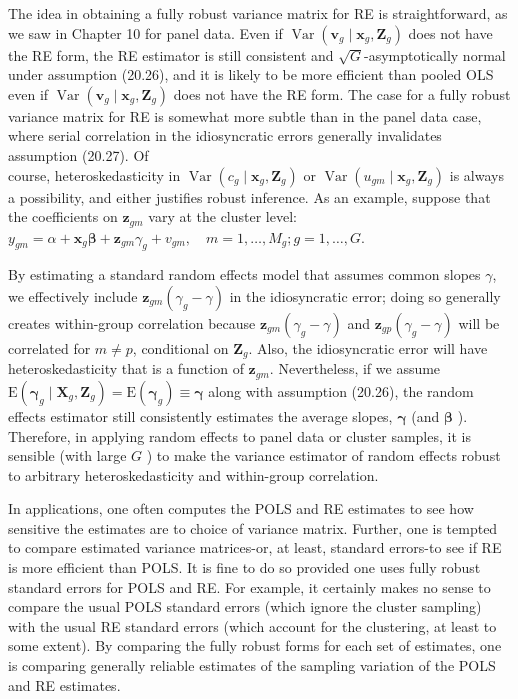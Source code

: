 \documentclass[10pt]{article}
\begin{document}
The idea in obtaining a fully robust variance matrix for RE is straightforward, as we saw in Chapter 10 for panel data. Even if $\operatorname{Var}\left(\mathbf{v}_{g} \mid \mathbf{x}_{g}, \mathbf{Z}_{g}\right)$ does not have the RE form, the RE estimator is still consistent and $\sqrt{G}$-asymptotically normal under assumption (20.26), and it is likely to be more efficient than pooled OLS even if $\operatorname{Var}\left(\mathbf{v}_{g} \mid \mathbf{x}_{g}, \mathbf{Z}_{g}\right)$ does not have the RE form. The case for a fully robust variance matrix for RE is somewhat more subtle than in the panel data case, where serial correlation in the idiosyncratic errors generally invalidates assumption (20.27). Of\\
course, heteroskedasticity in $\operatorname{Var}\left(c_{g} \mid \mathbf{x}_{g}, \mathbf{Z}_{g}\right)$ or $\operatorname{Var}\left(u_{g m} \mid \mathbf{x}_{g}, \mathbf{Z}_{g}\right)$ is always a possibility, and either justifies robust inference. As an example, suppose that the coefficients on $\mathbf{z}_{g m}$ vary at the cluster level:\\
$y_{g m}=\alpha+\mathbf{x}_{g} \boldsymbol{\beta}+\mathbf{z}_{g m} \gamma_{g}+v_{g m}, \quad m=1, \ldots, M_{g} ; g=1, \ldots, G$.

By estimating a standard random effects model that assumes common slopes $\gamma$, we effectively include $\mathbf{z}_{g m}\left(\gamma_{g}-\gamma\right)$ in the idiosyncratic error; doing so generally creates within-group correlation because $\mathbf{z}_{g m}\left(\gamma_{g}-\gamma\right)$ and $\mathbf{z}_{g p}\left(\gamma_{g}-\gamma\right)$ will be correlated for $m \neq p$, conditional on $\mathbf{Z}_{g}$. Also, the idiosyncratic error will have heteroskedasticity that is a function of $\mathbf{z}_{g m}$. Nevertheless, if we assume $\mathrm{E}\left(\boldsymbol{\gamma}_{g} \mid \mathbf{X}_{g}, \mathbf{Z}_{g}\right)=\mathrm{E}\left(\boldsymbol{\gamma}_{g}\right) \equiv \boldsymbol{\gamma}$ along with assumption (20.26), the random effects estimator still consistently estimates the average slopes, $\boldsymbol{\gamma}$ (and $\boldsymbol{\beta}$ ). Therefore, in applying random effects to panel data or cluster samples, it is sensible (with large $G$ ) to make the variance estimator of random effects robust to arbitrary heteroskedasticity and within-group correlation.

In applications, one often computes the POLS and RE estimates to see how sensitive the estimates are to choice of variance matrix. Further, one is tempted to compare estimated variance matrices-or, at least, standard errors-to see if RE is more efficient than POLS. It is fine to do so provided one uses fully robust standard errors for POLS and RE. For example, it certainly makes no sense to compare the usual POLS standard errors (which ignore the cluster sampling) with the usual RE standard errors (which account for the clustering, at least to some extent). By comparing the fully robust forms for each set of estimates, one is comparing generally reliable estimates of the sampling variation of the POLS and RE estimates.
\end{document}

